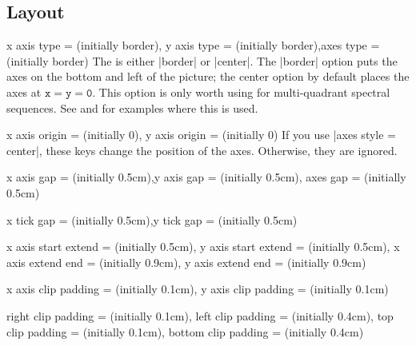 \begin{sseqdata}[|| name = ex1, cohomological Serre grading]
\subsection{Layout}
\begin{keylist}{x axis type =  (initially border), y axis type =  (initially border),axes type =  (initially border)}
The  is either |border| or |center|. The |border| option puts the axes on the bottom and left of the picture; the center option by default places the axes at $\mathtt{x = y = 0}$. This option is only worth using for multi-quadrant spectral sequences. See  and  for examples where this is used.
\end{keylist}

\parskip=0pt
\begin{keylist}{x axis origin =  (initially 0), y axis origin =  (initially 0)}
If you use |axes style = center|, these keys change the position of the axes. Otherwise, they are ignored.
\end{keylist}
%
%
\begin{keylist}{x axis gap =  (initially 0.5cm),y axis gap =  (initially 0.5cm), axes gap =  (initially 0.5cm)}
%
\end{keylist}
%
%
\begin{keylist}{x tick gap =  (initially 0.5cm),y tick gap =  (initially 0.5cm)}
%
\end{keylist}
%
\begin{keylist}{x axis start extend =  (initially 0.5cm), y axis start extend =  (initially 0.5cm),
                x axis extend end =  (initially 0.9cm), y axis extend end =  (initially 0.9cm)}
\end{keylist}
%
\begin{keylist}{x axis clip padding =  (initially 0.1cm), y axis clip padding =  (initially 0.1cm)}
\end{keylist}
%
\begin{keylist}{right clip padding =  (initially 0.1cm), left clip padding =  (initially 0.4cm),
                top clip padding =  (initially 0.1cm), bottom clip padding =  (initially 0.4cm)}
\end{keylist}


\end{sseqdata}
